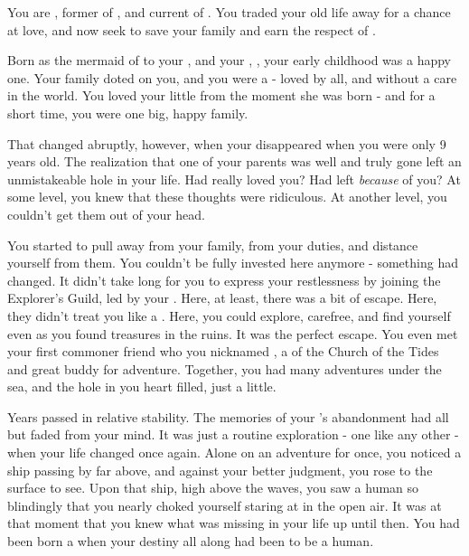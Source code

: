 \documentclass[char]{NeptuneBall}
\begin{document}
\name{\cAriel{}}





You are \cAriel{}, former \cAriel{\Prince} of \pAtlantis{}, and current \cAriel{\King} of \pAmerica{}. You traded your old life away for a chance at love, and now seek to save your family and earn the respect of \pAmerica{}.

Born as the mermaid \cAriel{\prince} of \pAtlantis{} to your \cKing{\parent}, \cKing{\King} \cKing{} and your \cQueen{\parent}, \cQueen{\King} \cQueen{}, your early childhood was a happy one. Your family doted on you, and you were a \cAriel{\prince} - loved by all, and without a care in the world. You loved your little \cPrincess{\sibling} \cPrincess{} from the moment she was born - and for a short time, you were one big, happy family.

That changed abruptly, however, when your \cQueen{\parent} disappeared when you were only 9 years old. The realization that one of your parents was well and truly gone left an unmistakeable hole in your life. Had \cQueen{\they} really loved you? Had \cQueen{\they} left \emph{because} of you? At some level, you knew that these thoughts were ridiculous. At another level, you couldn't get them out of your head.

You started to pull away from your family, from your duties, and distance yourself from them. You couldn't be fully invested here anymore - something had changed. It didn't take long for you to express your restlessness by joining the Explorer's Guild, led by your \cPlant{\Uncle} \cPlant{}. Here, at least, there was a bit of escape. Here, they didn't treat you like a \cAriel{\prince}. Here, you could explore, carefree, and find yourself even as you found treasures in the ruins. It was the perfect escape. You even met your first commoner friend who you nicknamed \cPriest{}, a \cPriest{\priest} of the Church of the Tides and great buddy for adventure. Together, you had many adventures under the sea, and the hole in you heart filled, just a little.

Years passed in relative stability. The memories of your \cQueen{\parent}'s abandonment had all but faded from your mind. It was just a routine exploration - one like any other - when your life changed once again. Alone on an adventure for once, you noticed a ship passing by far above, and against your better judgment, you rose to the surface to see. Upon that ship, high above the waves, you saw a human so blindingly \cEric{\hot} that you nearly choked yourself staring at \cEric{\them} in the open air. It was at that moment that you knew what was missing in your life up until then. You had been born a \cAriel{\mer} when your destiny all along had been to be a human.
\end{document}
